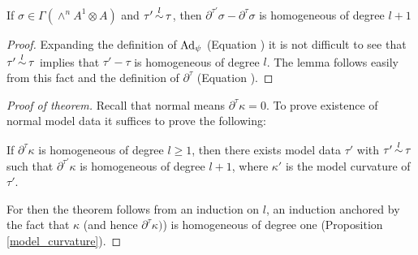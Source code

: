 \documentclass[leqno,12pt]{amsart} %
\begin{document}
\begin{lemmaB}
  If $\sigma \in \Gamma(\wedge^nA^1 \otimes A)$ and $\tau'{\overset{l}{\,\sim\,}}\tau $, then
  $\partial^{\tau'} \sigma -\partial^\tau \sigma $ is homogeneous of degree $l + 1$
\end{lemmaB}
\begin{proof}
  Expanding the definition of $\operatorname{Ad}_\psi $ (Equation ) it is
  not difficult to see that $\tau'{\overset{l}{\,\sim\,}}\tau $ implies that $\tau' - \tau $ is
  homogeneous of degree $l$. The lemma follows easily from this fact and the definition of
  $\partial^\tau$ (Equation ).
\end{proof}
\begin{proof}[Proof of theorem]
  Recall that {\df normal} means $\partial^\tau \kappa =0$. To prove existence of normal
  model data it suffices to prove the following:
  \begin{aside}
    If $\partial^\tau\kappa $ is homogeneous of degree $l \ge 1$, then there exists model
    data $\tau'$ with $\tau'{\overset{l}{\,\sim\,}} \tau $ such that $\partial^{\tau'}\kappa $ is
    homogeneous of degree $l + 1$, where $\kappa'$ is the model curvature of $\tau'$.
  \end{aside}
  For then the theorem follows from an induction on $l$, an induction anchored by the fact
  that $\kappa $ (and hence $\partial^\tau \kappa)$) is homogeneous of degree one
  (Proposition \ref{model_curvature}).


\end{proof}
\end{document}
